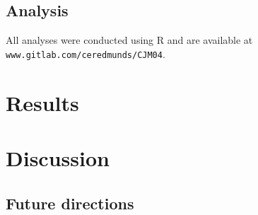 \documentclass[12pt]{article}
\begin{document}
\subsection{Analysis} 
All analyses were conducted using R \cite{Rcite} and are available at
\texttt{www.gitlab.com/ceredmunds/CJM04}.


\section{Results}


\section{Discussion}

\subsection{Future directions}


\newpage


\end{document}
